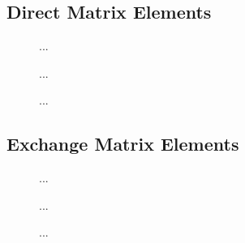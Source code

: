 \documentclass{article}
\begin{document}
\subsection{Direct Matrix Elements}
\label{sec:dir-me}

\begin{figure}[h]
  \begin{center}
    
  \end{center}
  \caption[Direct Matrix Elements 1s-1s]{
    ...
  }
  \label{fig:dir-me-1s-1s}
\end{figure}

\begin{figure}[h]
  \begin{center}
    
  \end{center}
  \caption[Direct Matrix Elements 1s-2s]{
    ...
  }
  \label{fig:dir-me-1s-2s}
\end{figure}

\begin{figure}[h]
  \begin{center}
    
  \end{center}
  \caption[Direct Matrix Elements 1s-3s]{
    ...
  }
  \label{fig:dir-me-1s-3s}
\end{figure}

\clearpage

\subsection{Exchange Matrix Elements}
\label{sec:exc-me}

\begin{figure}[h]
  \begin{center}
    
  \end{center}
  \caption[Exchange Matrix Elements 1s-1s]{
    ...
  }
  \label{fig:exc-me-1s-1s}
\end{figure}

\begin{figure}[h]
  \begin{center}
    
  \end{center}
  \caption[Exchange Matrix Elements 1s-2s]{
    ...
  }
  \label{fig:exc-me-1s-2s}
\end{figure}

\begin{figure}[h]
  \begin{center}
    
  \end{center}
  \caption[Exchange Matrix Elements 1s-3s]{
    ...
  }
  \label{fig:exc-me-1s-3s}
\end{figure}
\end{document}
